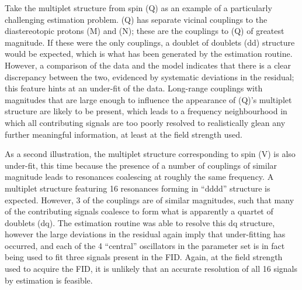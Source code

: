 Take the multiplet structure from spin (Q) as an example of a particularly
challenging estimation problem.
(Q) has separate vicinal couplings to the
diastereotopic protons (M) and (N); these are the couplings to
(Q) of greatest magnitude. If these were the only couplings, a doublet of doublets
(dd) structure would be expected, which is what has been generated by
the estimation routine.
However, a comparison of the data and
the model indicates that there is a clear discrepancy between the two,
evidenced by systematic deviations in the residual; this feature hints at an
under-fit of the data.
Long-range couplings with magnitudes that are large enough to influence the
appearance of (Q)'s multiplet structure are likely to be present, which leads
to a frequency neighbourhood in which all contributing signals are too poorly
resolved to realistically glean any further meaningful information, at least at
the field strength used.

As a second illustration, the multiplet structure corresponding to spin (V) is also
under-fit, this time because the presence of a number of couplings of similar
magnitude leads to resonances coalescing at roughly the same frequency. A
multiplet structure featuring 16 resonances forming in ``dddd'' structure is
expected. However, 3 of the couplings are of similar magnitudes, such that
many of the contributing signals coalesce to form what is apparently a quartet
of doublets (dq).
The estimation routine was able to resolve this dq structure,
however the large deviations in the residual again imply that under-fitting has
occurred, and each of the 4 ``central'' oscillators in the parameter set is in
fact being used to fit three signals present in the \ac{FID}. Again, at the
field strength used to acquire the \ac{FID}, it is unlikely that an accurate
resolution of all 16 signals by estimation is feasible.

